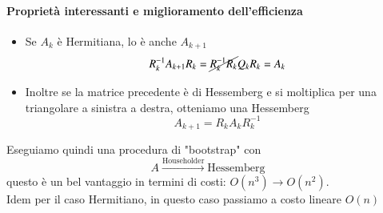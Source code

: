 \paragraph{Propriet\`a interessanti e miglioramento dell'efficienza}
\begin{itemize}
\item Se $A_k$ \`e Hermitiana, lo \`e anche $A_{k+1}$ \\
$$R_{k}^{-1} A_{k+1} R_{k} = \cancel{R_{k}^{-1} R_{k}} Q_{k} R_{k} = A_{k}$$
\item
Inoltre se la matrice precedente \`e di Hessemberg e si moltiplica
per  una triangolare a sinistra a destra, otteniamo una Hessemberg
$$ A_{k+1} = R_{k} A_{k} R_{k}^{-1} $$

\end{itemize}
Eseguiamo quindi una procedura di "bootstrap" con
$$ A \xrightarrow{\text{Householder}} \text{Hessemberg} $$
 questo \`e un bel vantaggio in termini di costi:  $O(n^{3})  \rightarrow O(n^{2})$. \\
Idem per il caso Hermitiano, in questo caso passiamo
a costo lineare $O(n)$



